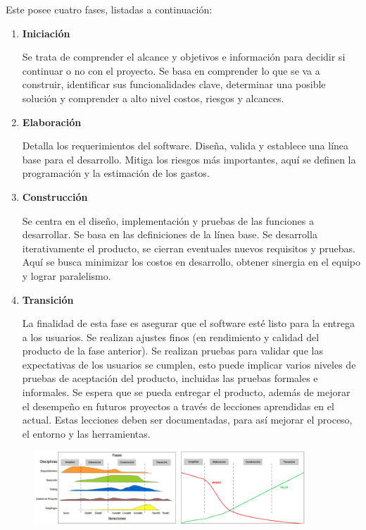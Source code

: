     Este posee cuatro fases, listadas a continuación:
    
    \begin{enumerate}
        \item \textbf{Iniciación}
        
            Se trata de comprender el alcance y objetivos e información para decidir si continuar o no con el proyecto. Se basa en comprender lo que se va a construir, identificar sus funcionalidades clave, determinar una posible solución y comprender a alto nivel costos, riesgos y alcances.
            
        \item \textbf{Elaboración}
        
            Detalla los requerimientos del software. Diseña, valida y establece una línea base para el desarrollo. Mitiga los riesgos más importantes, aquí se definen la programación y la estimación de los gastos.
            
        \item \textbf{Construcción}
        
            Se centra en el diseño, implementación y pruebas de las funciones a desarrollar. Se basa en las definiciones de la línea base. Se desarrolla iterativamente el producto, se cierran eventuales nuevos requisitos y pruebas. Aquí se busca minimizar los costos en desarrollo, obtener sinergia en el equipo y lograr paralelismo.
            
        \item \textbf{Transición}
        
            La finalidad de esta fase es asegurar que el software esté listo para la entrega a los usuarios. Se realizan ajustes finos (en rendimiento y calidad del producto de la fase anterior). Se realizan pruebas para validar que las expectativas de los usuarios se cumplen, esto puede implicar varios niveles de pruebas de aceptación del producto, incluidas las pruebas formales e informales. Se espera que se pueda entregar el producto, además de mejorar el desempeño en futuros proyectos a través de lecciones aprendidas en el actual. Estas lecciones deben ser documentadas, para así mejorar el proceso, el entorno y las herramientas.
            
    \end{enumerate}
    
    \begin{figure}[h]
        \begin{multicols}{2}
            \centering
            \includegraphics[width=0.48\textwidth]{imgs/5.png}
            \includegraphics[width=0.42\textwidth]{imgs/6.png}
        \end{multicols}
    \end{figure}